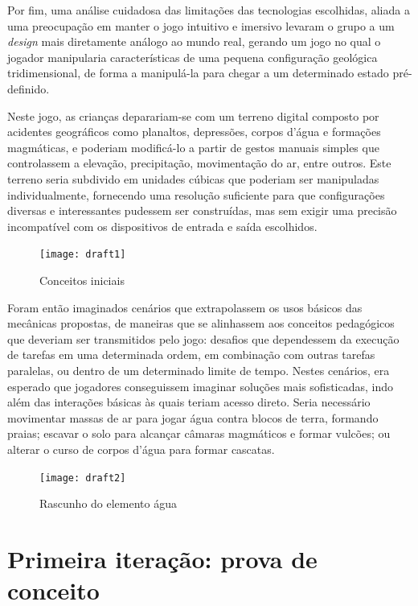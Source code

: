 Por fim, uma análise cuidadosa das limitações das tecnologias escolhidas, aliada a uma preocupação em manter o jogo intuitivo e imersivo levaram o grupo a um \textit{design} mais diretamente análogo ao mundo real, gerando um jogo no qual o jogador manipularia características de uma pequena configuração geológica tridimensional, de forma a manipulá-la para chegar a um determinado estado pré-definido.

Neste jogo, as crianças deparariam-se com um terreno digital composto por acidentes geográficos como planaltos, depressões, corpos d'água e formações magmáticas, e poderiam modificá-lo a partir de gestos manuais simples que controlassem a elevação, precipitação, movimentação do ar, entre outros. Este terreno seria subdivido em unidades cúbicas que poderiam ser manipuladas individualmente, fornecendo uma resolução suficiente para que configurações diversas e interessantes pudessem ser construídas, mas sem exigir uma precisão incompatível com os dispositivos de entrada e saída escolhidos.

\begin{figure}[h]
	\centering
	\texttt{[image: draft1]}
	\caption{Conceitos iniciais}
\end{figure}

Foram então imaginados cenários que extrapolassem os usos básicos das mecânicas propostas, de maneiras que se alinhassem aos conceitos pedagógicos que deveriam ser transmitidos pelo jogo: desafios que dependessem da execução de tarefas em uma determinada ordem, em combinação com outras tarefas paralelas, ou dentro de um determinado limite de tempo. Nestes cenários, era esperado que jogadores conseguissem imaginar soluções mais sofisticadas, indo além das interações básicas às quais teriam acesso direto. Seria necessário movimentar massas de ar para jogar água contra blocos de terra, formando praias; escavar o solo para alcançar câmaras magmáticos e formar vulcões; ou alterar o curso de corpos d'água para formar cascatas.

\begin{figure}[htb]
	\centering
	\texttt{[image: draft2]}
	\caption{Rascunho do elemento água}
\end{figure}

\section{Primeira iteração: prova de conceito}\label{sec-primeira-iteracao-prova-conceito}

